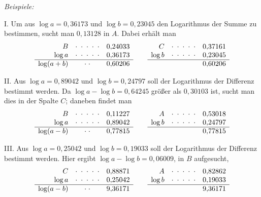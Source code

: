 \begin{center}\textit{Beispiele:}\end{center}

I. Um aus $\log a=0{,}36173$ und $\log b=0{,}23045$ den Logarithmus der Summe zu bestimmen, sucht man $0{,}13128$ in $A$. Dabei erhält man
\[
\begin{array}{rcr}
B&\cdot\;\cdot\;\cdot\;\cdot\;\cdot&0{,}24033\\
\log a&\cdot\;\cdot\;\cdot\;\cdot\;\cdot&0{,}36173\\\hline
\log(a+b)&\cdot\;\cdot&0{,}60206
\end{array}
\qquad
\begin{array}{rcr}
C&\cdot\;\cdot\;\cdot\;\cdot\;\cdot&0{,}37161\\
\log b&\cdot\;\cdot\;\cdot\;\cdot\;\cdot&0{,}23045\\\hline
&&0{,}60206
\end{array}
\]

II. Aus $\log a=0{,}89042$ und $\log b=0{,}24797$ soll der Logarithmus der Differenz bestimmt werden. Da $\log a-\log b=0{,}64245$ größer als $0{,}30103$ ist, sucht man dies in der Spalte $C$; daneben findet man
\[
\begin{array}{rcr}
B&\cdot\;\cdot\;\cdot\;\cdot\;\cdot&0{,}11227\\
\log a&\cdot\;\cdot\;\cdot\;\cdot\;\cdot&0{,}89042\\\hline
\log(a-b)&\cdot\;\cdot&0{,}77815
\end{array}
\qquad
\begin{array}{rcr}
A&\cdot\;\cdot\;\cdot\;\cdot\;\cdot&0{,}53018\\
\log b&\cdot\;\cdot\;\cdot\;\cdot\;\cdot&0{,}24797\\\hline
&&0{,}77815
\end{array}
\]

III. Aus $\log a=0{,}25042$ und $\log b=0{,}19033$ soll der Logarithmus der Differenz bestimmt werden. Hier ergibt $\log a-\log b=0{,}06009$, in $B$ aufgesucht,
\[
\begin{array}{rcr}
C&\cdot\;\cdot\;\cdot\;\cdot\;\cdot&0{,}88871\\
\log a&\cdot\;\cdot\;\cdot\;\cdot\;\cdot&0{,}25042\\\hline
\log(a-b)&\cdot\;\cdot&9{,}36171
\end{array}
\qquad
\begin{array}{rcr}
A&\cdot\;\cdot\;\cdot\;\cdot\;\cdot&0{,}82862\\
\log b&\cdot\;\cdot\;\cdot\;\cdot\;\cdot&0{,}19033\\\hline
&&9{,}36171
\end{array}
\]

